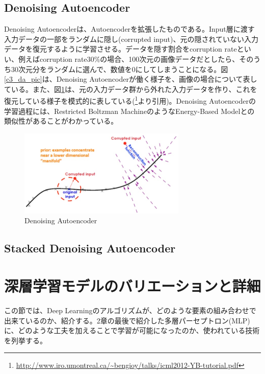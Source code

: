 \subsection{Denoising Autoencoder}
Denoising Autoencoderは、Autoencoderを拡張したものである。Input層に渡す入力データの一部をランダムに隠し(corrupted input)、元の隠されていない入力データを復元するように学習させる。データを隠す割合をcorruption rateといい、例えばcorruption rate30\%の場合、100次元の画像データだとしたら、そのうち30次元分をランダムに選んで、数値を0にしてしまうことになる。図\ref{c3_da_pic}は、Denoising Autoencoderが働く様子を、画像の場合について表している。また、図\ref{c3_da}は、元の入力データ群から外れた入力データを作り、これを復元している様子を模式的に表している(\footnote{\url{http://www.iro.umontreal.ca/~bengioy/talks/icml2012-YB-tutorial.pdf}}より引用)。Denoising Autoencoderの学習過程には、Restricted Boltzman MachineのようなEnergy-Based Modelとの類似性があることがわかっている\cite{vincent2011a-connection}。
\begin{figure}[tbp]
 \begin{center}
  \includegraphics[width=80mm]{img/c3/da}
 \end{center}
 \caption{Denoising Autoencoder}
 \label{c3_da}
\end{figure}

\subsection{Stacked Denoising Autoencoder}


\section{深層学習モデルのバリエーションと詳細}
この節では、Deep Learningのアルゴリズムが、どのような要素の組み合わせで出来ているのか、紹介する。2章の最後で紹介した多層パーセプトロン(MLP)に、どのような工夫を加えることで学習が可能になったのか、使われている技術を列挙する。

